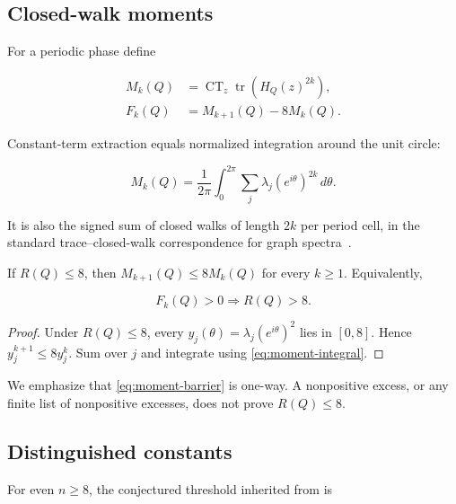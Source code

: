 \subsection{Closed-walk moments}

For a periodic phase define

\begin{equation}
\label{eq:moment-and-excess}
\begin{aligned}
M_k(Q)&=\operatorname{CT}_{z} \operatorname{tr}(H_Q(z)^{2k}), \\
F_k(Q)&=M_{k+1}(Q)-8M_k(Q).
\end{aligned}
\end{equation}

Constant-term extraction equals normalized integration around the unit circle:

\begin{equation}
\label{eq:moment-integral}
M_k(Q)=\frac{1}{2\pi}\int_{0}^{2\pi}\sum_j\lambda_j(e^{i\theta})^{2k}\,d\theta.
\end{equation}

It is also the signed sum of closed walks of length \(2k\) per period cell, in
the standard trace--closed-walk correspondence for graph spectra~\cite{CvetkovicRowlinsonSimic2010}.

\begin{lemma}
\label{lem:moment-barrier}
If \(R(Q)\leq 8\), then
\(M_{k+1}(Q)\leq 8M_k(Q)\) for every \(k\geq 1\). Equivalently,

\begin{equation}
\label{eq:moment-barrier}
F_k(Q)>0  \Longrightarrow  R(Q)>8.
\end{equation}

\end{lemma}
\begin{proof}
Under \(R(Q)\leq 8\), every
\(y_j(\theta)=\lambda_j(e^{i \theta})^{2}\) lies in \([0,8]\). Hence
\(y_j^{k+1}\leq 8y_j^k\). Sum over \(j\) and integrate using \eqref{eq:moment-integral}.

\end{proof}
We emphasize that \eqref{eq:moment-barrier} is one-way. A nonpositive excess, or any finite list
of nonpositive excesses, does not prove \(R(Q)\leq 8\).

\subsection{Distinguished constants}

For even \(n\geq 8\), the conjectured threshold inherited from \cite{Suvagiya2026Signed} is

